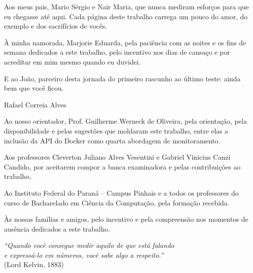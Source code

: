 \documentclass{ifpr-pinhais}
\begin{document}
\begin{dedicatoria}
\begin{minipage}{.6\textwidth}
    Aos meus pais, Mario Sérgio e Nair Maria, que nunca
    mediram esforços para que eu chegasse até aqui. Cada página deste trabalho
    carrega um pouco do amor, do exemplo e dos sacrifícios de vocês.

    À minha namorada, Marjorie Eduarda, pela paciência com as noites e
    os fins de semana dedicados a este trabalho, pelo incentivo nos dias de
    cansaço e por acreditar em mim mesmo quando eu duvidei.

    E ao João, parceiro desta jornada do primeiro rascunho ao último teste:
    ainda bem que você ficou.

    \begin{flushright}
      \upshape Rafael Correia Alves
    \end{flushright}
  \end{minipage}
\end{dedicatoria}

\begin{agradecimentos}
  Ao nosso orientador, Prof. Guilherme Werneck de Oliveira, pela orientação, pela
  disponibilidade e pelas sugestões que moldaram este trabalho, entre elas a inclusão
  da API do Docker como quarta abordagem de monitoramento.

  Aos professores Cleverton Juliano Alves Vesentini e Gabriel Vinicius Canzi Candido,
  por aceitarem compor a banca examinadora e pelas contribuições ao trabalho.

  Ao Instituto Federal do Paraná -- Campus Pinhais e a todos os professores do curso
  de Bacharelado em Ciência da Computação, pela formação recebida.

  Às nossas famílias e amigos, pelo incentivo e pela compreensão nos momentos de
  ausência dedicados a este trabalho.
\end{agradecimentos}

\begin{epigrafe}
  \vspace*{\fill}
  \begin{flushright}
    \textit{``Quando você consegue medir aquilo de que está falando\\
    e expressá-lo em números, você sabe algo a respeito.''}\\
    (Lord Kelvin, 1883)
  \end{flushright}
\end{epigrafe}
\end{document}
